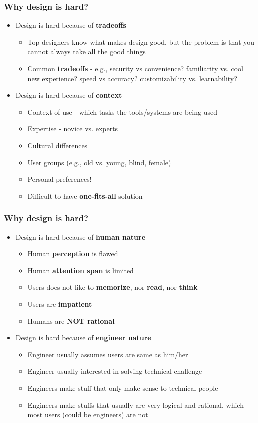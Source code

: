 \documentclass{beamer}
\begin{document}
\begin{frame}
\frametitle{Why design is hard?}
\begin{itemize}
	\item Design is hard because of \textbf{tradeoffs}
	\begin{itemize}
		\item Top designers know what makes design good, but the problem is that you cannot always take all the good things
		\item Common \textbf{tradeoffs} - e.g., security vs convenience? familiarity vs. cool new experience? speed vs accuracy? customizability vs. learnability?
	\end{itemize}
	\item Design is hard because of \textbf{context}
	\begin{itemize}
		\item Context of use - which tasks the tools/systems are being used
		\item Expertise - novice vs. experts
		\item Cultural differences
		\item User groups (e.g., old vs. young, blind, female)
		\item Personal preferences!  
		\item Difficult to have \textbf{one-fits-all} solution
	\end{itemize}
\end{itemize}
\end{frame}

\begin{frame}
\frametitle{Why design is hard?}
\begin{itemize}
\item Design is hard because of \textbf{human nature}
\begin{itemize}
	\item Human \textbf{perception} is flawed
	\item Human \textbf{attention span} is limited
	\item Users does not like to \textbf{memorize}, nor \textbf{read}, nor \textbf{think}
	\item Users are \textbf{impatient}
	\item Humans are \textbf{NOT rational}
\end{itemize}
\end{itemize}
\begin{itemize}
\item Design is hard because of \textbf{engineer nature}
\begin{itemize}
	\item Engineer usually assumes users are same as him/her
	\item Engineer usually interested in solving technical challenge
	\item Engineers make stuff that only make sense to technical people
	\item Engineers make stuffs that usually are very logical and rational, which most users (could be engineers) are not
\end{itemize}
\end{itemize}
\end{frame}
\end{document}
